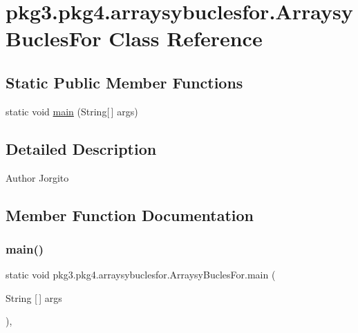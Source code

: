 \hypertarget{classpkg3_1_1pkg4_1_1arraysybuclesfor_1_1_arraysy_bucles_for}{}\section{pkg3.\+pkg4.\+arraysybuclesfor.\+Arraysy\+Bucles\+For Class Reference}
\label{classpkg3_1_1pkg4_1_1arraysybuclesfor_1_1_arraysy_bucles_for}
\subsection*{Static Public Member Functions}
\begin{DoxyCompactItemize}
\item 
static void \mbox{\hyperlink{classpkg3_1_1pkg4_1_1arraysybuclesfor_1_1_arraysy_bucles_for_a02220e5bf40cc135b53e2432bad5f3a4}{main}} (String\mbox{[}$\,$\mbox{]} args)
\end{DoxyCompactItemize}


\subsection{Detailed Description}
\begin{DoxyAuthor}{Author}
Jorgito 
\end{DoxyAuthor}


\subsection{Member Function Documentation}
\mbox{\label{classpkg3_1_1pkg4_1_1arraysybuclesfor_1_1_arraysy_bucles_for_a02220e5bf40cc135b53e2432bad5f3a4}} 
\subsubsection{\texorpdfstring{main()}{main()}}
{\footnotesize\ttfamily static void pkg3.\+pkg4.\+arraysybuclesfor.\+Arraysy\+Bucles\+For.\+main (\begin{DoxyParamCaption}\item[{String \mbox{[}$\,$\mbox{]}}]{args }\end{DoxyParamCaption})\hspace{0.3cm}{\ttfamily [inline]}, {\ttfamily [static]}}


